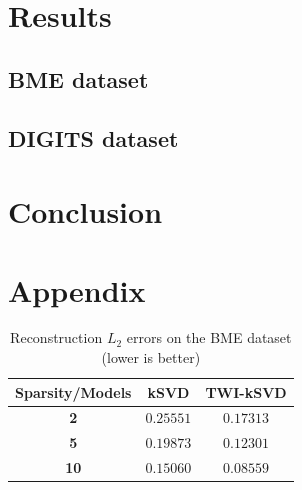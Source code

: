\documentclass[10pt,twocolumn,letterpaper]{article}
\begin{document}
\section{Results}
\label{sec:results}

\subsection{BME dataset}

\paragraph{} 

\subsection{DIGITS dataset}

\paragraph{} 


\section{Conclusion}
\label{sec:conclusion}

\paragraph{} 

\section{Appendix}
\label{sec:appendix}

\begin{table}[ht]
    \centering
        \begin{tabular}{ccc}
            \toprule
            \textbf{Sparsity/Models} & \textbf{kSVD} & \textbf{TWI-kSVD} \\
            \midrule
            \textbf{2} & $0.25551$ & $0.17313$ \\
            \textbf{5} & $0.19873$ & $0.12301$ \\
            \textbf{10} & $0.15060$ & $\bm{0.08559}$ \\
            \bottomrule
        \end{tabular}
    \caption{Reconstruction $L_2$ errors on the BME dataset (lower is better)}
    \label{tab:reconstruction_results_BME}
\end{table}
\end{document}
